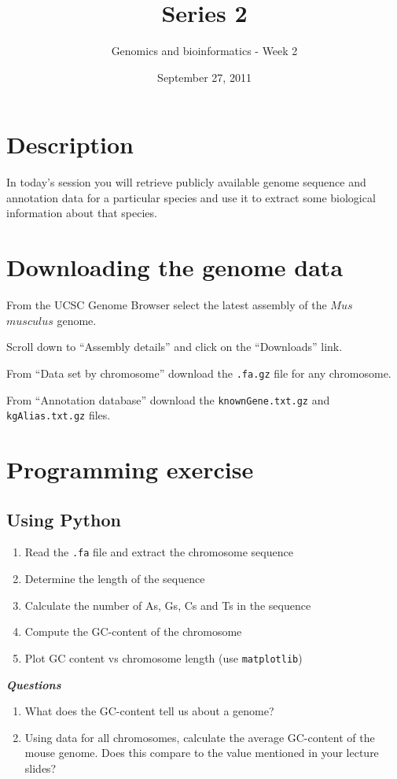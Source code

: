 \documentclass[a4paper,11pt]{article}
\title{Series 2}
\date{September 27, 2011}
\author{Genomics and bioinformatics - Week 2}
\begin{document}
\maketitle

\section{Description}
In today's session you will retrieve publicly available genome sequence and annotation data 
\indent for a particular species and use it to extract some biological information about that species.

\section{Downloading the genome data}
From the UCSC Genome Browser select the latest assembly of the $Mus$ $musculus$ genome.

Scroll down to ``Assembly details'' and click on the ``Downloads'' link.

From ``Data set by chromosome'' download the \texttt{.fa.gz} file for any chromosome.

From ``Annotation database'' download the \texttt{knownGene.txt.gz} and \texttt{kgAlias.txt.gz} files.

\section{Programming exercise}

\subsection{Using Python}
\begin{enumerate}
\item Read the \texttt{.fa} file and extract the chromosome sequence
\item Determine the length of the sequence
\item Calculate the number of As, Gs, Cs and Ts in the sequence
\item Compute the GC-content of the chromosome
\item Plot GC content vs chromosome length (use  \texttt{matplotlib})
\end{enumerate}

\Large{\emph\bf Questions}
\begin{enumerate}
\normalsize\item What does the GC-content tell us about a genome? 
\item Using data for all chromosomes, calculate the average GC-content of the mouse genome. Does this compare to the value mentioned in your lecture slides?
\end{enumerate}
\end{document}
